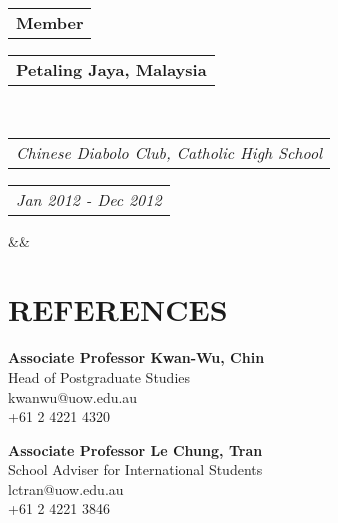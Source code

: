 \documentclass[11pt,a4paper]{moderncv}
\makeatletter
\newcommand*{\customcventry}[7][.25em]{
  \begin{tabular}{@{}l} 
    {\bfseries #4}
  \end{tabular}
  \hfill%
  \begin{tabular}{l@{}}
     {\bfseries #5}
  \end{tabular} \\
  \begin{tabular}{@{}l} 
    {\itshape #3}
  \end{tabular}
  \hfill%
  \begin{tabular}{l@{}}
     {\itshape #2}
  \end{tabular}
  \ifx&#7&%
  \else{\\%
    \begin{minipage}{\maincolumnwidth}%
      \small#7%
    \end{minipage}}\fi%
  \par\addvspace{#1}}
\makeatother
\begin{document}
{\customcventry{Jan 2012 - Dec 2012}{Chinese Diabolo Club, Catholic High School}{Member}{Petaling Jaya, Malaysia}{}{}}
\vspace*{2mm}


\section{REFERENCES \faAsterisk}

\begin{minipage}{0.5\textwidth}
    \textbf{Associate Professor Kwan-Wu, Chin} \\
    Head of Postgraduate Studies \\
    kwanwu@uow.edu.au \\
    +61 2 4221 4320
\end{minipage}
\begin{minipage}{0.5\textwidth}
    \textbf{Associate Professor Le Chung, Tran} \\
    School Adviser for International Students \\
    lctran@uow.edu.au \\
    +61 2 4221 3846
\end{minipage}
\end{document}
